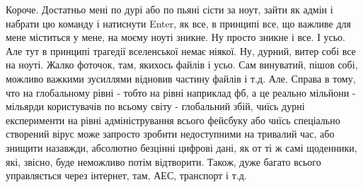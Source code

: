 Короче. Достатньо мені по дурі або по пьяні сісти за ноут, зайти як адмін і
набрати цю команду і натиснути Enter, як все, в принципі все, що важливе для
мене міститься у мене,  на моєму ноуті зникне. Ну просто зникне і все. І усьо.
Але тут в принципі трагедії вселенської немає ніякої. Ну, дурний, витер собі
все на ноуті. Жалко фоточок, там, якихось файлів і усьо. Сам винуватий, пішов
собі, можливо важкими зусиллями відновив частину файлів і т.д. Але. Справа в
тому, что на глобальному рівні - тобто на рівні наприклад фб, а це реально
мільйони - мільярди користувачів по всьому світу - глобальний збій, чиїсь дурні
експерименти на рівні адміністрування всього фейсбуку або чиїсь спеціально
створений вірус може запросто зробити недоступними на тривалий час, або знищити
назавжди, абсолютно безцінні цифрові дані, як от ті ж самі щоденники, які,
звісно, буде неможливо потім відтворити. Також, дуже багато всього управляється
через інтернет, там, АЕС, транспорт і т.д.

